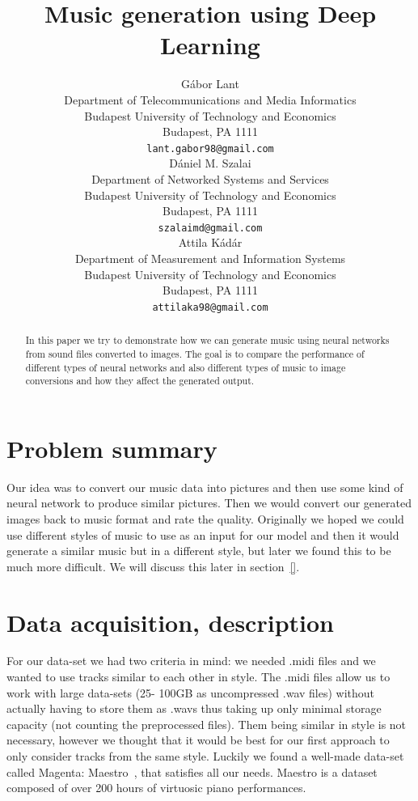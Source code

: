 \documentclass{article}
\title{Music generation using Deep Learning}
\author{
	Gábor Lant \\
	Department of Telecommunications and Media Informatics\\
	Budapest University of Technology and Economics\\
	Budapest, PA 1111 \\
	\texttt{lant.gabor98@gmail.com} \\
	\And
	Dániel M. Szalai\\
	Department of Networked Systems and Services\\
	Budapest University of Technology and Economics\\
	Budapest, PA 1111\\
	\texttt{szalaimd@gmail.com}\\
	\And
	Attila Kádár\\
	Department of Measurement and Information Systems\\
	Budapest University of Technology and Economics\\
	Budapest, PA 1111\\
	\texttt{attilaka98@gmail.com}
}
\begin{document}

\maketitle



\begin{abstract}
  In this paper we try to demonstrate how we can generate music using neural networks from sound files converted to images. The goal is to compare the performance of different types of neural networks and also different types of music to image conversions and how they affect the generated output.
\end{abstract}


\section{Problem summary}
\label{sec:summary}
Our idea was to convert our music data into pictures and then use some kind of neural network to produce similar pictures. Then we would convert our generated images back to music format and rate the quality. Originally we hoped we could use different styles of music to use as an input for our model and then it would generate a similar music but in a different style, but later we found this to be much more difficult. We will discuss this later in section~\ref{}.

\section{Data acquisition, description}
\label{sec:data}
For our data-set we had two criteria in mind: we needed .midi files and we wanted to use tracks similar to each other in style. The .midi files allow us to work with large data-sets (25- 100GB as uncompressed .wav files) without actually having to store them as .wavs thus taking up only minimal storage capacity (not counting the preprocessed files). Them being similar in style is not necessary, however we thought that it would be best for our first approach to only consider tracks from the same style. Luckily we found a well-made data-set called Magenta: Maestro~\cite{maestro}, that satisfies all our needs. Maestro is a dataset composed of over 200 hours of virtuosic piano performances.
\end{document}

